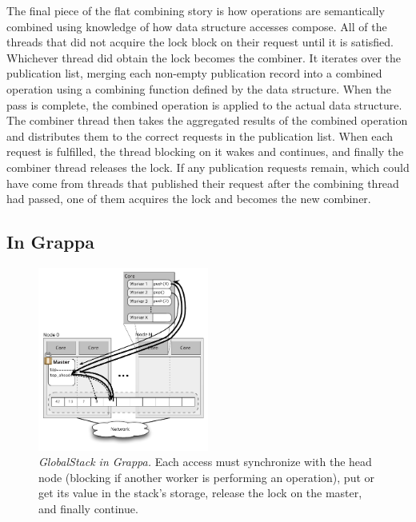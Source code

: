 The final piece of the flat combining story is how operations are semantically combined using knowledge of how data structure accesses compose. All of the threads that did not acquire the lock block on their request until it is satisfied. Whichever thread did obtain the lock becomes the combiner. It iterates over the publication list, merging each non-empty publication record into a combined operation using a combining function defined by the data structure. When the pass is complete, the combined operation is applied to the actual data structure. The combiner thread then takes the aggregated results of the combined operation and distributes them to the correct requests in the publication list. When each request is fulfilled, the thread blocking on it wakes and continues, and finally the combiner thread releases the lock. If any publication requests remain, which could have come from threads that published their request after the combining thread had passed, one of them acquires the lock and becomes the new combiner.


\subsection{In Grappa}


\begin{figure}[ht]
  \centering
  \includegraphics[width=0.5\textwidth]{figs/stack.pdf}
  \caption{\emph{GlobalStack in Grappa.} Each access must synchronize with the head node (blocking if another worker is performing an operation), put or get its value in the stack's storage, release the lock on the master, and finally continue.}
  \label{fig:stack}
\end{figure}


